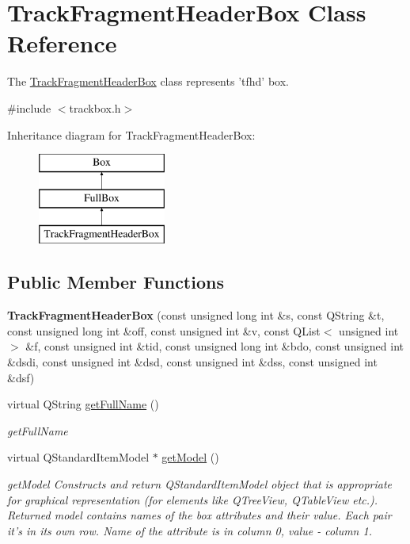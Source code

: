 \hypertarget{class_track_fragment_header_box}{\section{Track\-Fragment\-Header\-Box Class Reference}
\label{class_track_fragment_header_box}
}


The \hyperlink{class_track_fragment_header_box}{Track\-Fragment\-Header\-Box} class represents 'tfhd' box.  




{\ttfamily \#include $<$trackbox.\-h$>$}

Inheritance diagram for Track\-Fragment\-Header\-Box\-:\begin{figure}[H]
\begin{center}
\leavevmode
\includegraphics[height=3.000000cm]{class_track_fragment_header_box}
\end{center}
\end{figure}
\subsection*{Public Member Functions}
\begin{DoxyCompactItemize}
\item 
\hypertarget{class_track_fragment_header_box_a32b98a44d9d7d12309455a535484296b}{{\bfseries Track\-Fragment\-Header\-Box} (const unsigned long int \&s, const Q\-String \&t, const unsigned long int \&off, const unsigned int \&v, const Q\-List$<$ unsigned int $>$ \&f, const unsigned int \&tid, const unsigned long int \&bdo, const unsigned int \&dsdi, const unsigned int \&dsd, const unsigned int \&dss, const unsigned int \&dsf)}\label{class_track_fragment_header_box_a32b98a44d9d7d12309455a535484296b}

\item 
virtual Q\-String \hyperlink{class_track_fragment_header_box_a6868fba2faed6053702b3c70751195e2}{get\-Full\-Name} ()
\begin{DoxyCompactList}\small\item\em get\-Full\-Name \end{DoxyCompactList}\item 
virtual Q\-Standard\-Item\-Model $\ast$ \hyperlink{class_track_fragment_header_box_ae27a4cc65245d755a88ae0661f568189}{get\-Model} ()
\begin{DoxyCompactList}\small\item\em get\-Model Constructs and return Q\-Standard\-Item\-Model object that is appropriate for graphical representation (for elements like Q\-Tree\-View, Q\-Table\-View etc.). Returned model contains names of the box attributes and their value. Each pair it's in its own row. Name of the attribute is in column 0, value -\/ column 1. \end{DoxyCompactList}\end{DoxyCompactItemize}
